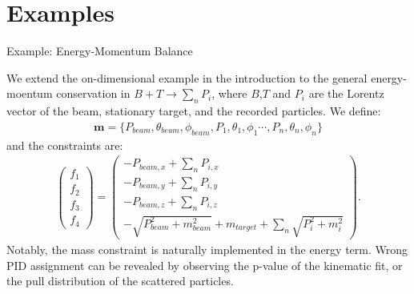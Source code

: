 \documentclass[
	xcolor=dvipsnames,
	aspectratio=169,	
	10pt, 
	]{beamer}
\begin{document}
\section{Examples}
\begin{frame}{Example: Energy-Momentum Balance}
	\begin{block}{}
		We extend the on-dimensional example in the introduction to the general energy-moentum conservation in $B+T\to \sum_n P_i$, where $B$,$T$ and $P_i$ are the Lorentz vector of the beam, stationary target, and the recorded particles.
		We define:
		\begin{align}
			\mathbf{m} = \{P_{beam},\theta_{beam},\phi_{beam},P_{1},\theta_{1},\phi_{1}\cdots,P_{n},\theta_{n},\phi_{n}\}
		\end{align}
		and the constraints are:
				\begin{align}
			\begin{pmatrix}
				f_1\\f_2\\f_3\\f_4
			\end{pmatrix}=
			\begin{pmatrix}
				-P_{beam,x}+\sum_n {P_{i,x}}\\
				-P_{beam,y}+\sum_n {P_{i,y}}\\
				-P_{beam,z}+\sum_n {P_{i,z}}\\
				-\sqrt{P_{beam}^2+m_{beam}^2}+m_{target}+\sum_n \sqrt{P_i^2+m_i^2}
			\end{pmatrix}.\label{FMat}
		\end{align}
		Notably, the mass constraint is naturally implemented in the energy term.
		Wrong PID assignment can be revealed by observing the p-value of the kinematic fit, or the pull distribution of the scattered particles.	
	\end{block}
\end{frame}
\end{document}
